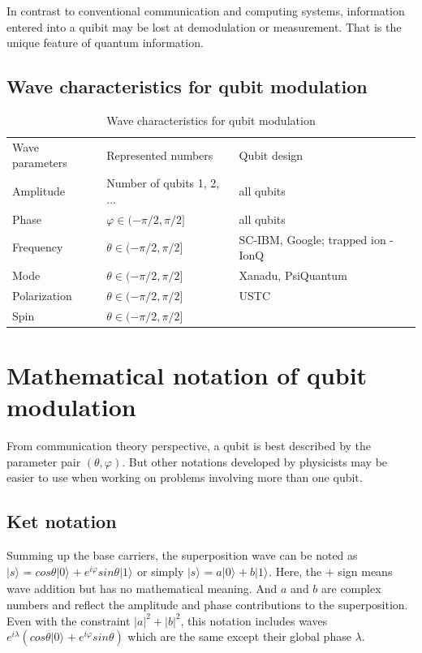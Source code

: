 \documentclass{book}
\newcommand{\keta}[2][]{\vert {#2} \rangle_{#1}}
\begin{document}
In contrast to conventional communication and computing systems, information entered into a quibit may be lost at demodulation or measurement. That is the unique feature of quantum information.

\subsection{Wave characteristics for qubit modulation}
\begin{table}[]
\caption{Wave characteristics for qubit modulation}
\label{modulation-characteristics}
\begin{tabular}{lll}
Wave parameters &Represented numbers &Qubit design   \\
Amplitude & Number of qubits 1, 2, ... & all qubits \\
Phase & $\varphi \in (-\pi /2, \pi /2] $& all qubits \\
Frequency & $\theta \in (-\pi /2, \pi /2]$ & SC-IBM, Google; trapped ion - IonQ \\
Mode & $\theta \in (-\pi /2, \pi /2]$ & Xanadu, PsiQuantum \\
Polarization & $\theta \in (-\pi /2, \pi /2]$ & USTC \\
Spin & $\theta \in (-\pi /2, \pi /2]$ & 
\end{tabular}
\end{table}

\section{Mathematical notation of qubit modulation}
From communication theory perspective, a qubit is best described by the parameter pair $(\theta, \varphi)$. But other notations developed by physicists may be easier to use when working on problems involving more than one qubit. 
\subsection{Ket notation}
Summing up the base carriers, the superposition wave can be noted as $\keta{s} = cos{\theta} \keta{0} + e^{i \varphi} sin{\theta} \keta{1}$ or simply $\keta{s} = a \keta{0} + b \keta{1}$. Here, the $+$ sign means wave addition but has no mathematical meaning. And $a$ and $b$ are complex numbers and reflect the amplitude and phase contributions to the superposition. Even with the constraint $|a|^2+ |b|^2$, this notation includes waves $e^{i\lambda} (cos{\theta} \keta{0} + e^{i \varphi} sin{\theta})$ which are the same except their global phase $\lambda$.
\end{document}
